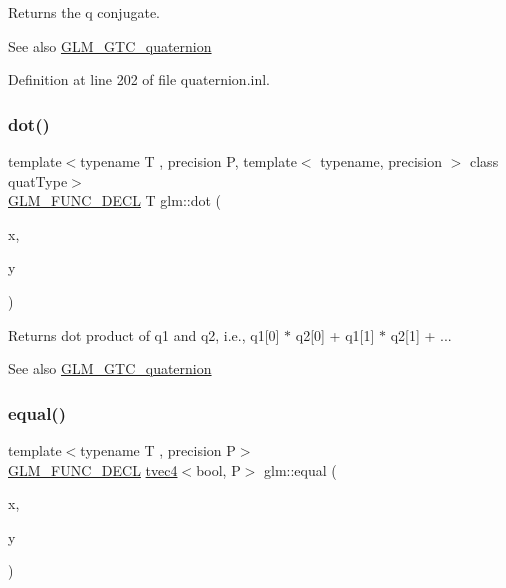 Returns the q conjugate.

\begin{DoxySeeAlso}{See also}
\mbox{\hyperlink{group__gtc__quaternion}{G\+L\+M\+\_\+\+G\+T\+C\+\_\+quaternion}} 
\end{DoxySeeAlso}


Definition at line 202 of file quaternion.\+inl.

\mbox{\label{group__gtc__quaternion_gac54dfc83de465a2d03e90d342242ab3d}} 
\subsubsection{\texorpdfstring{dot()}{dot()}}
{\footnotesize\ttfamily template$<$typename T , precision P, template$<$ typename, precision $>$ class quat\+Type$>$ \\
\mbox{\hyperlink{setup_8hpp_ab2d052de21a70539923e9bcbf6e83a51}{G\+L\+M\+\_\+\+F\+U\+N\+C\+\_\+\+D\+E\+CL}} T glm\+::dot (\begin{DoxyParamCaption}\item[{quat\+Type$<$ T, P $>$ const \&}]{x,  }\item[{quat\+Type$<$ T, P $>$ const \&}]{y }\end{DoxyParamCaption})}

Returns dot product of q1 and q2, i.\+e., q1\mbox{[}0\mbox{]} $\ast$ q2\mbox{[}0\mbox{]} + q1\mbox{[}1\mbox{]} $\ast$ q2\mbox{[}1\mbox{]} + ...

\begin{DoxySeeAlso}{See also}
\mbox{\hyperlink{group__gtc__quaternion}{G\+L\+M\+\_\+\+G\+T\+C\+\_\+quaternion}} 
\end{DoxySeeAlso}
\mbox{\label{group__gtc__quaternion_gac187115710365e0b2902220b9611e7b6}} 
\subsubsection{\texorpdfstring{equal()}{equal()}}
{\footnotesize\ttfamily template$<$typename T , precision P$>$ \\
\mbox{\hyperlink{setup_8hpp_ab2d052de21a70539923e9bcbf6e83a51}{G\+L\+M\+\_\+\+F\+U\+N\+C\+\_\+\+D\+E\+CL}} \mbox{\hyperlink{structglm_1_1tvec4}{tvec4}}$<$bool, P$>$ glm\+::equal (\begin{DoxyParamCaption}\item[{\mbox{\hyperlink{structglm_1_1tquat}{tquat}}$<$ T, P $>$ const \&}]{x,  }\item[{\mbox{\hyperlink{structglm_1_1tquat}{tquat}}$<$ T, P $>$ const \&}]{y }\end{DoxyParamCaption})}

